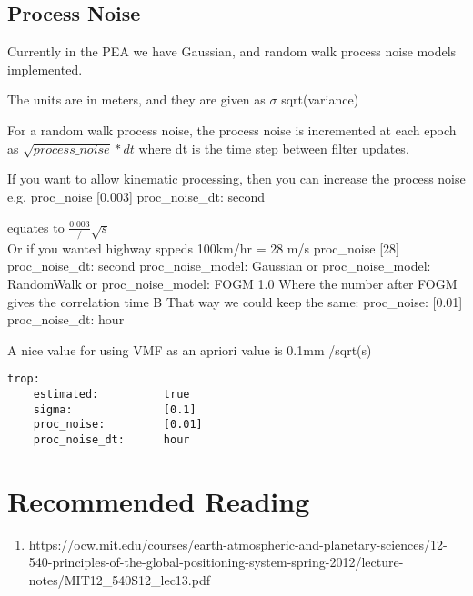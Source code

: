 

\subsection{Process Noise}

Currently in the PEA we have Gaussian, and random walk process noise models implemented.

The units are in meters, and they are given as $\sigma$ sqrt(variance)

For a random walk process noise, the process noise is incremented at each epoch as $\sqrt{process\_noise}*dt$ where dt is the time step between filter updates.

If you want to allow kinematic processing, then you can increase the process noise e.g.
proc\_noise [0.003]
proc\_noise\_dt: second 

equates to $\frac{0.003}/\sqrt{s}$
\\ 
Or if you wanted highway sppeds 100km/hr = 28 m/s
proc\_noise [28]
proc\_noise\_dt: second
proc\_noise\_model:   Gaussian
or
         proc\_noise\_model:   RandomWalk
or
         proc\_noise\_model:   FOGM 1.0
Where the number after FOGM gives the correlation time B
That way we could keep the same:
            proc\_noise:         [0.01]
            proc\_noise\_dt:      hour

A nice value for using VMF as an apriori value is 0.1mm /sqrt(s)
%
\begin{lstlisting}
trop:
    estimated:          true
    sigma:              [0.1]
    proc_noise:         [0.01]
    proc_noise_dt:      hour
\end{lstlisting}



\section{Recommended Reading}

\begin{enumerate}
    \item https://ocw.mit.edu/courses/earth-atmospheric-and-planetary-sciences/12-540-principles-of-the-global-positioning-system-spring-2012/lecture-notes/MIT12\_540S12\_lec13.pdf
\end{enumerate}

